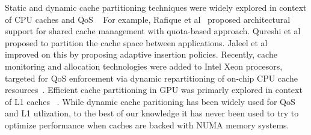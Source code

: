 Static and dynamic cache partitioning techniques were widely explored in
context of CPU caches and QoS
~\cite{ics2007,Herdrich2016CacheQF,pact06,qureshi-micro,jaleel-pact} For
example, Rafique et al~\cite{pact06} proposed architectural support for shared
cache management with quota-based approach. Qureshi et al~\cite{qureshi-micro}
proposed to partition the cache space between applications. Jaleel et
al~\cite{jaleel-pact} improved on this by proposing adaptive insertion
policies. Recently, cache monitoring and allocation technologies were added to
Intel Xeon procesors, targeted for QoS enforcement via dynamic repartitioning
of on-chip CPU cache resources~\cite{Herdrich2016CacheQF}.  Efficient cache
partitioning in GPU was primarly explored in context of L1 caches
~\cite{li-priority-based}. While dynamic cache paritioning has been widely used for
QoS and L1 utlization, to the best of our knowledge it has never been used
to try to optimize performance when caches are backed with NUMA memory
systems.